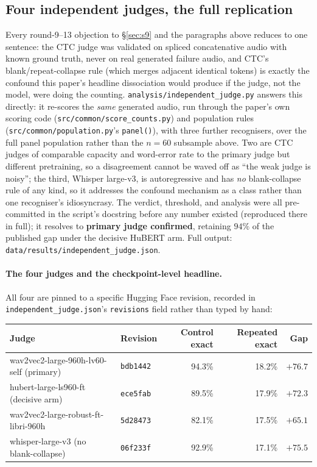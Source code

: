 \documentclass[11pt]{article}
\begin{document}
\subsection{Four independent judges, the full replication}
\label{sec:s14-judges}

Every round-9--13 objection to \S\ref{sec:s9} and the paragraphs above reduces
to one sentence: the CTC judge was validated on spliced concatenative audio
with known ground truth, never on real generated failure audio, and CTC's
blank/repeat-collapse rule (which merges adjacent identical tokens) is
exactly the confound this paper's headline dissociation would produce if the
judge, not the model, were doing the counting. \texttt{analysis/independent\_judge.py}
answers this directly: it re-scores the \emph{same} generated audio, run
through the paper's own scoring code (\texttt{src/common/score\_counts.py})
and population rules (\texttt{src/common/population.py}'s \texttt{panel()}),
with three further recognisers, over the full panel population rather than
the $n{=}60$ subsample above. Two are CTC judges of comparable capacity and
word-error rate to the primary judge but different pretraining, so a
disagreement cannot be waved off as ``the weak judge is noisy''; the third,
Whisper large-v3, is autoregressive and has \emph{no} blank-collapse rule of
any kind, so it addresses the confound mechanism as a class rather than one
recogniser's idiosyncrasy. The verdict, threshold, and analysis were all
pre-committed in the script's docstring before any number existed (reproduced
there in full); it resolves to \textbf{primary judge confirmed}, retaining
$94\%$ of the published gap under the decisive HuBERT arm. Full output:
\texttt{data/results/independent\_judge.json}.

\paragraph{The four judges and the checkpoint-level headline.} All four are
pinned to a specific Hugging Face revision, recorded in
\texttt{independent\_judge.json}'s \texttt{revisions} field rather than typed
by hand:

\begin{center}
\small
\begin{tabular}{llrrr}
\toprule
Judge & Revision & Control exact & Repeated exact & Gap \\
\midrule
wav2vec2-large-960h-lv60-self (primary) & \texttt{bdb1442} & 94.3\% & 18.2\% & $+76.7$ \\
hubert-large-ls960-ft (decisive arm) & \texttt{ece5fab} & 89.5\% & 17.9\% & $+72.3$ \\
wav2vec2-large-robust-ft-libri-960h & \texttt{5d28473} & 82.1\% & 17.5\% & $+65.1$ \\
whisper-large-v3 (no blank-collapse) & \texttt{06f233f} & 92.9\% & 17.1\% & $+75.5$ \\
\bottomrule
\end{tabular}
\end{center}
\end{document}
